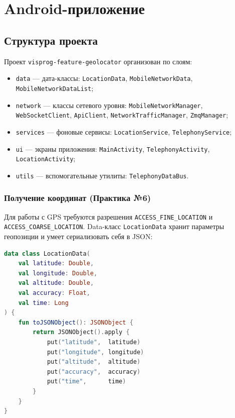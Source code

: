 \documentclass[a4paper,14pt,oneside,openany]{memoir}
\begin{document}
\chapter{Android-приложение}

\section{Структура проекта}

Проект \texttt{visprog-feature-geolocator} организован по слоям:
\begin{itemize}
  \item \texttt{data} --- дата-классы:
        \texttt{LocationData}, \texttt{MobileNetworkData},
        \texttt{MobileNetworkDataList};
  \item \texttt{network} --- классы сетевого уровня:
        \texttt{MobileNetworkManager}, \texttt{WebSocketClient},
        \texttt{ApiClient}, \texttt{NetworkTrafficManager},
        \texttt{ZmqManager};
  \item \texttt{services} --- фоновые сервисы:
        \texttt{LocationService}, \texttt{TelephonyService};
  \item \texttt{ui} --- экраны приложения:
        \texttt{MainActivity}, \texttt{TelephonyActivity},
        \texttt{LocationActivity};
  \item \texttt{utils} --- вспомогательные утилиты:
        \texttt{TelephonyDataBus}.
\end{itemize}

\subsection{Получение координат (Практика №6)}

Для работы с GPS требуются разрешения \texttt{ACCESS\_FINE\_LOCATION} и
\texttt{ACCESS\_COARSE\_LOCATION}. Data-класс \texttt{LocationData} хранит
параметры геопозиции и умеет сериализовать себя в JSON:

\begin{lstlisting}[language=Kotlin, caption={data/LocationData.kt}]
data class LocationData(
    val latitude: Double,
    val longitude: Double,
    val altitude: Double,
    val accuracy: Float,
    val time: Long
) {
    fun toJSONObject(): JSONObject {
        return JSONObject().apply {
            put("latitude",  latitude)
            put("longitude", longitude)
            put("altitude",  altitude)
            put("accuracy",  accuracy)
            put("time",      time)
        }
    }
}
\end{lstlisting}
\end{document}
